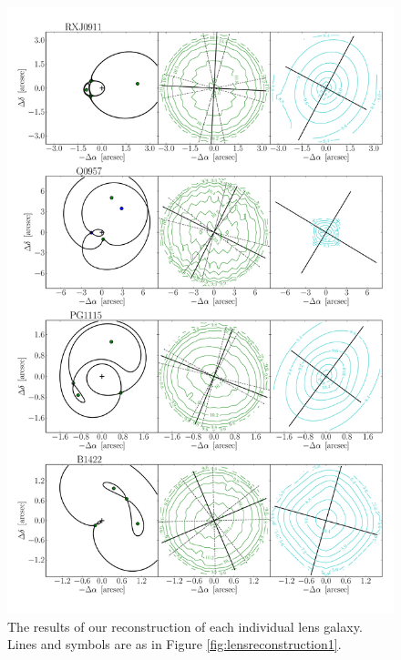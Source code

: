 \documentclass[useAMS,usenatbib]{mn2e}
\begin{document}
\begin{figure}
  \centering
  \includegraphics[width=.83\linewidth]{Figures/AllLenses32.pdf}
  \caption[width=.65\linewidth]{The results of our reconstruction of each individual lens galaxy. Lines and symbols are as in Figure \ref{fig:lensreconstruction1}.}
  \label{fig:lensreconstruction2}
\end{figure}
\end{document}
